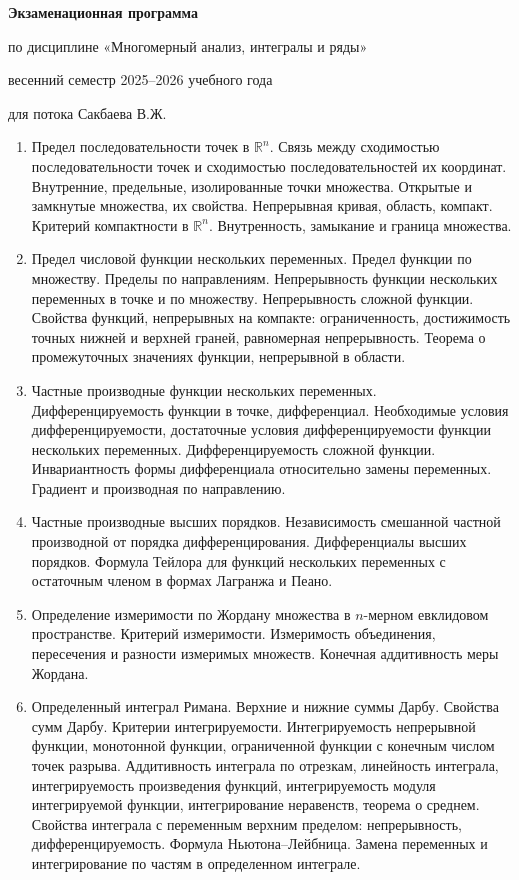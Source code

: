 \documentclass[12pt,a4paper]{article}
\begin{document}
\begin{center}
{\large\bfseries Экзаменационная программа}

по дисциплине «Многомерный анализ, интегралы и ряды»

весенний семестр 2025--2026 учебного года

для потока Сакбаева В.Ж.
\end{center}

\begin{enumerate}
\item Предел последовательности точек в $\mathbb{R}^n$. Связь между сходимостью
последовательности точек и сходимостью последовательностей их координат.
Внутренние, предельные, изолированные точки множества. Открытые и замкнутые
множества, их свойства. Непрерывная кривая, область, компакт. Критерий
компактности в $\mathbb{R}^n$. Внутренность, замыкание и граница множества.

\item Предел числовой функции нескольких переменных. Предел функции по множеству.
Пределы по направлениям. Непрерывность функции нескольких переменных в точке и
по множеству. Непрерывность сложной функции. Свойства функций, непрерывных на
компакте: ограниченность, достижимость точных нижней и верхней граней,
равномерная непрерывность. Теорема о промежуточных значениях функции,
непрерывной в области.

\item Частные производные функции нескольких переменных. Дифференцируемость
функции в точке, дифференциал. Необходимые условия дифференцируемости,
достаточные условия дифференцируемости функции нескольких переменных.
Дифференцируемость сложной функции. Инвариантность формы дифференциала
относительно замены переменных. Градиент и производная по направлению.

\item Частные производные высших порядков. Независимость смешанной частной
производной от порядка дифференцирования. Дифференциалы высших порядков.
Формула Тейлора для функций нескольких переменных с остаточным членом в формах
Лагранжа и Пеано.

\item Определение измеримости по Жордану множества в $n$-мерном евклидовом
пространстве. Критерий измеримости. Измеримость объединения, пересечения и
разности измеримых множеств. Конечная аддитивность меры Жордана.

\item Определенный интеграл Римана. Верхние и нижние суммы Дарбу. Свойства сумм
Дарбу. Критерии интегрируемости. Интегрируемость непрерывной функции,
монотонной функции, ограниченной функции с конечным числом точек разрыва.
Аддитивность интеграла по отрезкам, линейность интеграла, интегрируемость
произведения функций, интегрируемость модуля интегрируемой функции,
интегрирование неравенств, теорема о среднем. Свойства интеграла с переменным
верхним пределом: непрерывность, дифференцируемость. Формула
Ньютона--Лейбница. Замена переменных и интегрирование по частям в определенном
интеграле.


\end{enumerate}
\end{document}
